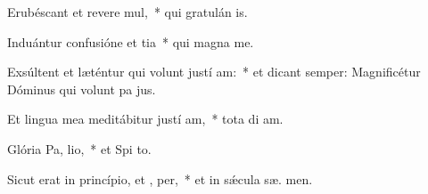 \item Erubéscant et revere mul,~* qui gratulán  is.
\item Induántur confusióne et tia~* qui magna   me.
\item Exsúltent et læténtur qui volunt justí am:~* et dicant semper: Magnificétur Dóminus qui volunt pa  jus.
\item Et lingua mea meditábitur justí am,~* tota di  am.
\item Glória Pa,  lio,~* et Spi to.
\item Sicut erat in princípio, et ,  per,~* et in sǽcula sæ. men.
